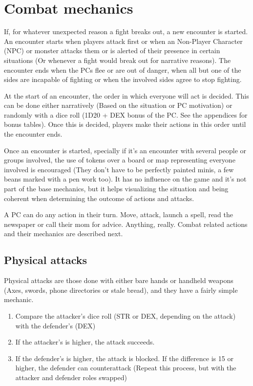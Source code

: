 \section{Combat mechanics}

If, for whatever unexpected reason a fight breaks out, a new encounter is started. An encounter starts when players attack first or when an Non-Player Character (NPC) or monster attacks them or is alerted of their presence in certain situations (Or whenever a fight would break out for narrative reasons). The encounter ends when the PCs flee or are out of danger, when all but one of the sides are incapable of fighting or when the involved sides agree to stop fighting.

At the start of an encounter, the order in which everyone will act is decided. This can be done either narratively (Based on the situation or PC motivation) or randomly with a dice roll (1D20 + DEX bonus of the PC. See the appendices for bonus tables). Once this is decided, players make their actions in this order until the encounter ends.

Once an encounter is started, specially if it's an encounter with several people or groups involved, the use of tokens over a board or map representing everyone involved is encouraged (They don't have to be perfectly painted minis, a few beans marked with a pen work too). It has no influence on the game and it's not part of the base mechanics, but it helps visualizing the situation and being coherent when determining the outcome of actions and attacks.

A PC can do any action in their turn. Move, attack, launch a spell, read the newspaper or call their mom for advice. Anything, really. Combat related actions and their mechanics are described next.

\subsection{Physical attacks}

Physical attacks are those done with either bare hands or handheld weapons (Axes, swords, phone directories or stale bread), and they have a fairly simple mechanic.

\begin{enumerate}
\item Compare the attacker's dice roll (STR or DEX, depending on the attack) with the defender's (DEX)
\item If the attacker's is higher, the attack succeeds.
\item If the defender's is higher, the attack is blocked. If the difference is 15 or higher, the defender can counterattack (Repeat this process, but with the attacker and defender roles swapped)
\end{enumerate}

